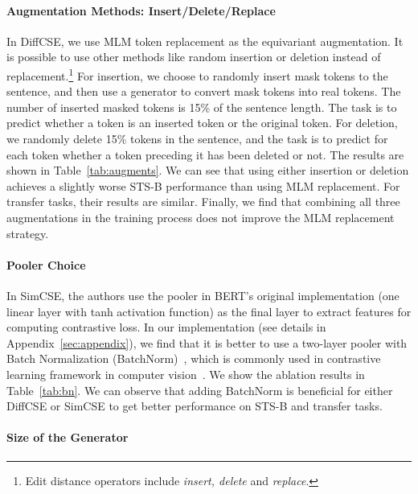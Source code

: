 \documentclass[11pt]{article}
\begin{document}
\paragraph{Augmentation Methods: Insert/Delete/Replace}

In DiffCSE, we use MLM token replacement as the equivariant augmentation. It is possible to use other methods like random insertion or deletion instead of replacement.\footnote{Edit distance operators include \emph{insert, delete} and \emph{replace}.} For insertion, we choose to randomly insert mask tokens to the sentence, and then use a generator to convert mask tokens into real tokens. The number of inserted masked tokens is 15\% of the sentence length. The task is to predict whether a token is an inserted token or the original token. For deletion, we randomly delete 15\% tokens in the sentence, and the task  is to predict for each token whether a token preceding it has been deleted or not. The results are shown in Table~\ref{tab:augments}. We can see that using either insertion or deletion achieves a slightly worse STS-B performance than using MLM replacement. For transfer tasks, their results are similar. Finally, we find that combining all three augmentations in the training process does not improve the MLM replacement strategy.


\paragraph{Pooler Choice}

In SimCSE, the authors use the pooler in BERT’s original implementation (one linear layer with tanh activation function) as the final layer to extract features for computing contrastive loss. In our implementation (see details in Appendix~\ref{sec:appendix}), we find that it is better to use a two-layer pooler with Batch Normalization (BatchNorm)~\cite{ioffe2015batch}, which is commonly used in contrastive learning framework in computer vision~\cite{chen2020simple, grill2020byol, chen2021exploring, hua2021feature}. We show the ablation results in Table~\ref{tab:bn}. We can observe that adding BatchNorm is beneficial for either DiffCSE or SimCSE to get better performance on STS-B and transfer tasks.



\paragraph{Size of the Generator}
\end{document}

